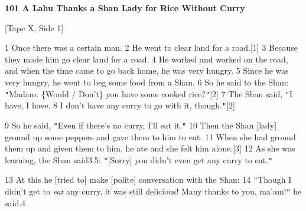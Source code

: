
\textbf{101 A Lahu Thanks a Shan Lady for Rice Without Curry }

[Tape X, Side 1]

1 Once there was a certain man. 2 He went to clear land for a road.[1] 3 Because
they made him go clear land for a road. 4 He worked and worked on the road, and
when the time came to go back home, he was very hungry. 5 Since he was very hungry,
he went to beg some food from a Shan. 6 So he said to the Shan: \texttt{"}Madam.
\{Would / Don't\} you have some cooked rice?\texttt{"}[2] 7 The Shan said, \texttt{"}I
have, I have. 8 I don't have any curry to go with it, though.\texttt{"}[2]

9 So he said, \texttt{"}Even if there's no curry, I'll eat it.\texttt{"} 10 Then
the Shan [lady] ground up some peppers and gave them to him to eat. 11 When she
had ground them up and given them to him, he ate and she felt him alone.[3] 12
As she was learning, the Shan said3.5: \texttt{"}[Sorry] you didn't even get any
curry to eat.\texttt{"}

13 At this he [tried to] make [polite] conversation with the Shan: 14 \texttt{"}Though
I didn't get to \textit{eat} any curry, it was still delicious! Many thanks to
you, ma'am!\texttt{"} he said.4


